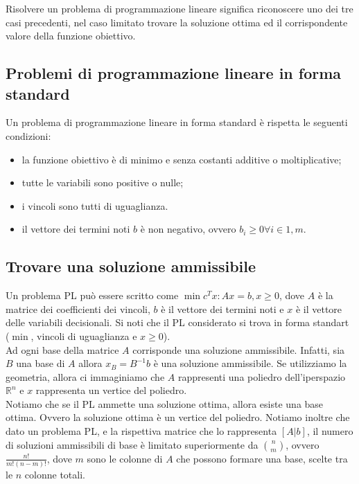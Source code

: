 \documentclass[12pt]{article}
\begin{document}
Risolvere un problema di programmazione lineare significa riconoscere uno dei
tre casi precedenti, nel caso limitato trovare la soluzione ottima ed il
corrispondente valore della funzione obiettivo.

\subsection{Problemi di programmazione lineare in forma standard}

Un problema di programmazione lineare in forma standard è rispetta le seguenti
condizioni:
\begin{itemize}
	\item la funzione obiettivo è di minimo e senza costanti additive o
	      moltiplicative;
	\item tutte le variabili sono positive o nulle;
	\item i vincoli sono tutti di uguaglianza.
	\item il vettore dei termini noti $b$ è non negativo, ovvero $b_i \geq 0
		      \forall i \in {1, m}$.
\end{itemize}

\subsection{Trovare una soluzione ammissibile}

Un problema PL può essere scritto come $\min{c^T x: Ax=b, x \geq 0}$, dove $A$
è la matrice dei coefficienti dei vincoli, $b$ è il vettore dei termini noti e
$x$ è il vettore delle variabili decisionali. Si noti che il PL considerato si
trova in forma standart ($\min$, vincoli di uguaglianza e $x \geq 0$).\\
Ad ogni base della matrice $A$ corrisponde una soluzione ammissibile. Infatti,
sia $B$ una base di $A$ allora $x_B = B^{-1} b$ è una soluzione ammissibile. Se
utilizziamo la geometria, allora ci immaginiamo che $A$ rappresenti una poliedro
dell'iperspazio $\mathbb{R}^n$ e $x$ rappresenta un vertice del poliedro.\\
Notiamo che se il PL ammette una soluzione ottima, allora esiste una base
ottima. Ovvero la soluzione ottima è un vertice del poliedro.
Notiamo inoltre che dato un problema PL, e la rispettiva matrice che lo
rappresenta $[A|b]$, il numero di soluzioni ammissibili di base è limitato
superiormente da $\binom{n}{m}$, ovvero $\frac{n!}{m!(n-m)!}$, dove $m$ sono le
colonne di $A$ che possono formare una base, scelte tra le $n$ colonne totali.
\end{document}

